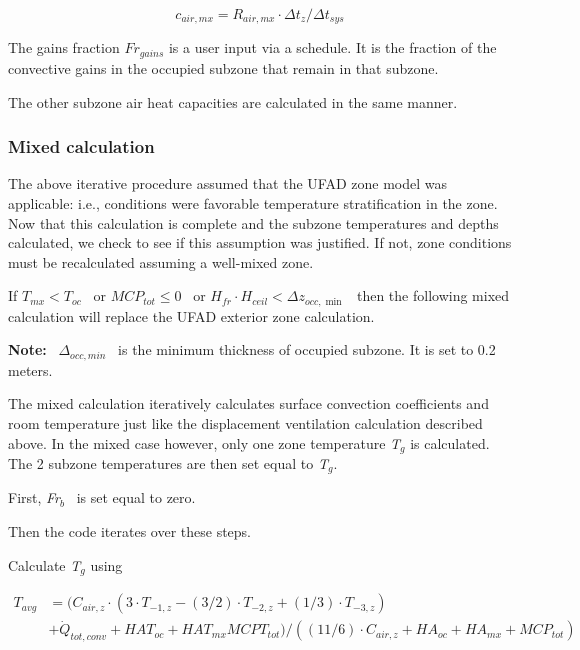 \begin{equation}
{c_{air,mx}} = {R_{air,mx}} \cdot \Delta {t_z}/\Delta {t_{sys}}
\end{equation}

The gains fraction \(F{r_{gains}}\) is a user input via a schedule. It is the fraction of the convective gains in the occupied subzone that remain in that subzone.

The other subzone air heat capacities are calculated in the same manner.

\subsubsection{Mixed calculation}\label{mixed-calculation-2}

The above iterative procedure assumed that the UFAD zone model was applicable: i.e., conditions were favorable temperature stratification in the zone. Now that this calculation is complete and the subzone temperatures and depths calculated, we check to see if this assumption was justified. If not, zone conditions must be recalculated assuming a well-mixed zone.

If \({T_{mx}} < {T_{oc}}\) ~or \(MC{P_{tot}} \le 0\) ~or \({H_{fr}} \cdot {H_{ceil}} < \Delta {z_{occ,\min }}\) ~then the following mixed calculation will replace the UFAD exterior zone calculation.

\textbf{Note:} ~\({\Delta_{occ,min}}\) ~is the minimum thickness of occupied subzone. It is set to 0.2 meters.

The mixed calculation iteratively calculates surface convection coefficients and room temperature just like the displacement ventilation calculation described above. In the mixed case however, only one zone temperature \emph{T\(_{g}\)} is calculated. The 2 subzone temperatures are then set equal to \emph{T\(_{g}\)}.

First, \emph{Fr\(_{b}\)}~ is set equal to zero.

Then the code iterates over these steps.

Calculate \emph{T\(_{g}\)} using

\begin{equation}
  \begin{array}{rl}
    T_{avg} &= ({C_{air,z}} \cdot (3 \cdot {T_{ - 1,z}} - (3/2) \cdot {T_{ - 2,z}} + (1/3) \cdot {T_{ - 3,z}}) \\
            &+ {{\dot Q}_{tot,conv}} + HA{T_{oc}} + HA{T_{mx}}MCP{T_{tot}})/((11/6) \cdot {C_{air,z}} + H{A_{oc}} + H{A_{mx}} + MC{P_{tot}})
  \end{array}
\end{equation}

